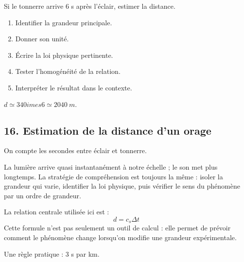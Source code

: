\documentclass[11pt,a4paper]{article}
\begin{document}
\begin{exercicebox}
Si le tonnerre arrive 6 s après l'éclair, estimer la distance.
\begin{enumerate}
  \item Identifier la grandeur principale.
  \item Donner son unité.
  \item Écrire la loi physique pertinente.
  \item Tester l'homogénéité de la relation.
  \item Interpréter le résultat dans le contexte.
\end{enumerate}
\end{exercicebox}

\begin{corrigebox}[Indication]
$d\simeq340	imes6\simeq\SI{2040}{m}$.
\end{corrigebox}


\subsection{16. Estimation de la distance d'un orage}

\begin{exemplebox}
On compte les secondes entre éclair et tonnerre.
\end{exemplebox}

\begin{methodebox}
La lumière arrive quasi instantanément à notre échelle ; le son met plus longtemps.
La stratégie de compréhension est toujours la même : isoler la grandeur qui varie, identifier la loi physique, puis vérifier le sens du phénomène par un ordre de grandeur.
\end{methodebox}

\begin{theorembox}
La relation centrale utilisée ici est :
\[
d=c_s\Delta t
\]
Cette formule n'est pas seulement un outil de calcul : elle permet de prévoir comment le phénomène change lorsqu'on modifie une grandeur expérimentale.
\end{theorembox}

\begin{odgbox}
Une règle pratique : 3 s par km.
\end{odgbox}
\end{document}
